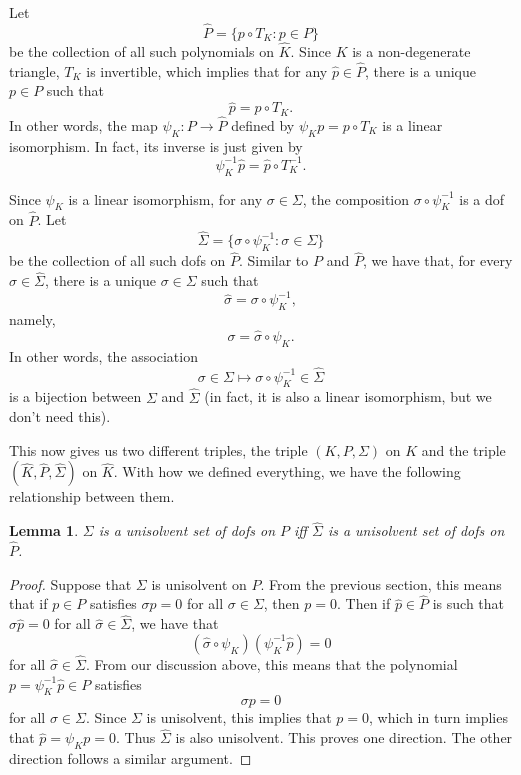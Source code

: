 \documentclass{article}
\theoremstyle{plain}
\newtheorem{lemma}{Lemma}
\theoremstyle{definition}
\theoremstyle{remark}
\begin{document}
Let \[\widehat P = \{p\circ T_K : p \in P\}\] be the collection of all such polynomials on $\widehat K$.
Since $K$ is a non-degenerate triangle, $T_K$ is invertible, which implies that for any $\widehat p \in \widehat P$, there is a unique $p \in P$ such that \[\widehat p = p\circ T_K.\]
In other words, the map $\psi_K : P \to \widehat P$ defined by $\psi_K p = p \circ T_K$ is a linear isomorphism.
In fact, its inverse is just given by \[\psi_K^{-1}\widehat p = \widehat p \circ T_K^{-1}.\]

Since $\psi_K$ is a linear isomorphism, for any $\sigma \in \Sigma$, the composition $\sigma \circ \psi_K^{-1}$ is a dof on $\widehat P$.
Let \[\widehat \Sigma = \{\sigma \circ \psi_K^{-1} : \sigma \in \Sigma\}\] be the collection of all such dofs on $\widehat P$.
Similar to $P$ and $\widehat P$, we have that, for every $\widehat \sigma \in \widehat \Sigma$, there is a unique $\sigma \in \Sigma$ such that \[\widehat \sigma = \sigma \circ \psi_K^{-1},\] namely, \[\sigma = \widehat\sigma \circ \psi_K.\]
In other words, the association \[\sigma \in \Sigma \mapsto \sigma \circ \psi_K^{-1} \in \widehat \Sigma\] is a bijection between $\Sigma$ and $\widehat \Sigma$ (in fact, it is also a linear isomorphism, but we don't need this).

This now gives us two different triples, the triple $(K, P, \Sigma)$ on $K$ and the triple $(\widehat K, \widehat P, \widehat \Sigma)$ on $\widehat K$.
With how we defined everything, we have the following relationship between them.
\begin{lemma}
	$\Sigma$ is a unisolvent set of dofs on $P$ iff $\widehat \Sigma$ is a unisolvent set of dofs on $\widehat P$.
\end{lemma}
\begin{proof}
	Suppose that $\Sigma$ is unisolvent on $P$.
	From the previous section, this means that if $p \in P$ satisfies $\sigma p = 0$ for all $\sigma \in \Sigma$, then $p = 0$.
	Then if $\widehat p \in \widehat P$ is such that $\widehat \sigma \widehat p = 0$ for all $\widehat \sigma \in \widehat \Sigma$, we have that \[ (\widehat \sigma \circ \psi_K)(\psi_K^{-1}\widehat p) = 0\] for all $\widehat \sigma \in \widehat \Sigma$.
	From our discussion above, this means that the polynomial $p = \psi_K^{-1} \widehat p \in P$ satisfies \[\sigma p = 0\] for all $\sigma \in \Sigma$.
	Since $\Sigma$ is unisolvent, this implies that $p = 0$, which in turn implies that $\widehat p = \psi_K p = 0$.
	Thus $\widehat \Sigma$ is also unisolvent. This proves one direction. The other direction follows a similar argument.
\end{proof}
\end{document}
